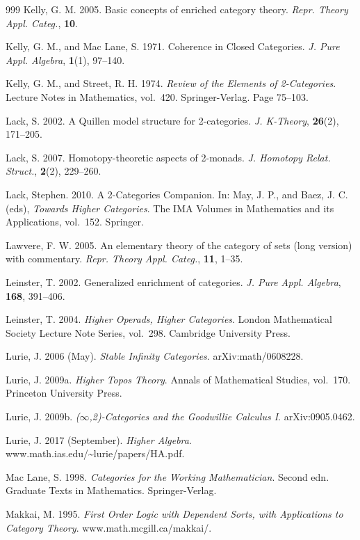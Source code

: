 \begin{thebibliography}{999}
 Kelly, G. M. 2005. Basic concepts of enriched category theory.
  \emph{Repr. Theory Appl. Categ.}, \textbf{10}.

 Kelly, G. M., and Mac Lane, S. 1971. Coherence in Closed
  Categories. \emph{J. Pure Appl. Algebra}, \textbf{1}(1), 97--140.

 Kelly, G. M., and Street, R. H. 1974. \emph{Review of the
  Elements of 2-Categories}. Lecture Notes in Mathematics, vol.~420.
  Springer-Verlag. Page 75--103.

 Lack, S. 2002. A Quillen model structure for 2-categories.
  \emph{J. K-Theory}, \textbf{26}(2), 171--205.

 Lack, S. 2007. Homotopy-theoretic aspects of 2-monads. \emph{J.
  Homotopy Relat. Struct.}, \textbf{2}(2), 229--260.

 Lack, Stephen. 2010. A 2-Categories Companion. In: May, J. P.,
  and Baez, J. C. (eds), \emph{Towards Higher Categories}. The IMA Volumes in
  Mathematics and its Applications, vol.~152. Springer.

 Lawvere, F. W. 2005. An elementary theory of the category of sets
  (long version) with commentary. \emph{Repr. Theory Appl. Categ.},
  \textbf{11}, 1--35.

 Leinster, T. 2002. Generalized enrichment of categories.
  \emph{J. Pure Appl. Algebra}, \textbf{168}, 391--406.

 Leinster, T. 2004. \emph{Higher Operads, Higher Categories}.
  London Mathematical Society Lecture Note Series, vol.~298. Cambridge
  University Press.

 Lurie, J. 2006 (May). \emph{Stable Infinity Categories}.
  arXiv:math/0608228.

 Lurie, J. 2009a. \emph{Higher Topos Theory}. Annals of
  Mathematical Studies, vol.~170. Princeton University Press.

 Lurie, J. 2009b. \emph{($\infty$,2)-Categories and the Goodwillie
  Calculus I}. arXiv:0905.0462.

 Lurie, J. 2017 (September). \emph{Higher Algebra}.
  www.math.ias.edu/\textasciitilde{}lurie/papers/HA.pdf.

 Mac Lane, S. 1998. \emph{Categories for the Working
  Mathematician}. Second edn. Graduate Texts in Mathematics. Springer-Verlag.

 Makkai, M. 1995. \emph{First Order Logic with Dependent Sorts,
  with Applications to Category Theory}. www.math.mcgill.ca/makkai/.


\end{thebibliography}
